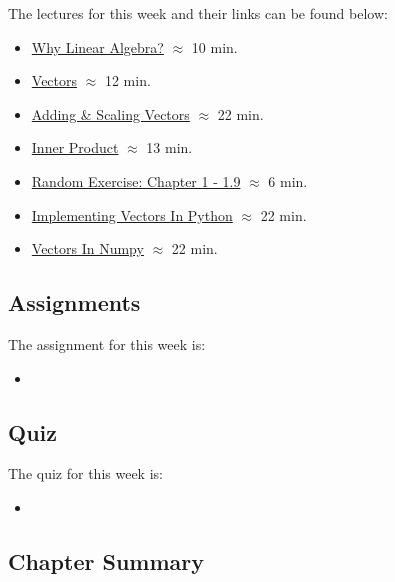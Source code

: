 The lectures for this week and their links can be found below:

\begin{itemize}
    \item \href{https://applied.cs.colorado.edu/mod/hvp/view.php?id=50664}{Why Linear Algebra?} $\approx$ 10 min.
    \item \href{https://applied.cs.colorado.edu/mod/hvp/view.php?id=50666}{Vectors} $\approx$ 12 min.
    \item \href{https://applied.cs.colorado.edu/mod/hvp/view.php?id=50667}{Adding \& Scaling Vectors} $\approx$ 22 min.
    \item \href{https://applied.cs.colorado.edu/mod/hvp/view.php?id=50668}{Inner Product} $\approx$ 13 min.
    \item \href{https://applied.cs.colorado.edu/mod/hvp/view.php?id=50669}{Random Exercise: Chapter 1 - 1.9} $\approx$ 6 min.
    \item \href{https://applied.cs.colorado.edu/mod/hvp/view.php?id=50670}{Implementing Vectors In Python} $\approx$ 22 min.
    \item \href{https://applied.cs.colorado.edu/mod/hvp/view.php?id=50671}{Vectors In Numpy} $\approx$ 22 min.
\end{itemize}

\subsection{Assignments}

The assignment for this week is:

\begin{itemize}
    \item {}
\end{itemize}

\subsection{Quiz}

The quiz for this week is:

\begin{itemize}
    \item {}
\end{itemize}

\subsection{Chapter Summary}

